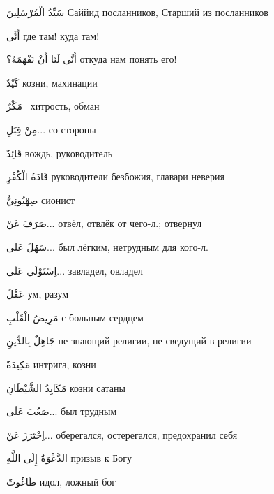 \documentclass[a5paper]{article}
\newcommand\textstyleDropCaps[1]{#1}
\newcommand\textstyleCaptioncharacters[1]{#1}
\begin{document}
\textstyleCaptioncharacters{سَيِّدُ الْمُرْسَلِينَ }\textstyleDropCaps{Сайй­ид посланников, Старший из посланников‎}

\textstyleCaptioncharacters{أَنَّى }\textstyleDropCaps{где там! куда там!‎}

\textstyleCaptioncharacters{أَنَّى لَنَا أَنْ نَفْهَمَهُ؟ }\textstyleDropCaps{откуда нам понять его! ‎}

\textstyleCaptioncharacters{كَيْدٌ }\textstyleDropCaps{козни, махинации‎}

\textstyleCaptioncharacters{مَكْرٌ \ }\textstyleDropCaps{хитрость, обман‎}

\textstyleCaptioncharacters{مِنْ قِبَلِ... }\textstyleDropCaps{со стороны‎}

\textstyleCaptioncharacters{قَائِدٌ }\textstyleDropCaps{вождь, руководитель‎}

\textstyleCaptioncharacters{قَادَةُ الْكُفْرِ }\textstyleDropCaps{руководите­ли безбожия, главари неверия‎}

\textstyleCaptioncharacters{صِهْيُونِيٌّ }\textstyleDropCaps{сионист‎}

\textstyleCaptioncharacters{صَرَفَ عَنْ... }\textstyleDropCaps{отвёл, от­влёк от чего-л.; отвернул‎}

\textstyleCaptioncharacters{سَهُلَ عَلى... }\textstyleDropCaps{был лёг­ким, нетрудным для кого-л.‎}

\textstyleCaptioncharacters{اِسْتَوْلَى عَلَى... }\textstyleDropCaps{завла­дел, овладел‎}

\textstyleCaptioncharacters{عَقْلٌ }\textstyleDropCaps{ум, разум‎}

\textstyleCaptioncharacters{مَرِيضُ الْقَلْبِ }\textstyleDropCaps{с боль­ным сердцем‎}

\textstyleCaptioncharacters{جَاهِلٌ بِالدِّينِ }\textstyleDropCaps{не знаю­щий религии, не сведущий в религии‎}

\textstyleCaptioncharacters{مَكِيدَةٌ }\textstyleDropCaps{интрига, козни‎}

\textstyleCaptioncharacters{مَكَايِدُ الشَّيْطَانِ }\textstyleDropCaps{козни сатаны‎}

\textstyleCaptioncharacters{صَعُبَ عَلَى... }\textstyleDropCaps{был труд­ным‎}

\textstyleCaptioncharacters{اِحْتَرَزَ عَنْ... }\textstyleDropCaps{оберегался, остерегался, предохранил себя‎}

\textstyleCaptioncharacters{الدَّعْوَةُ إِلَى اللَّهِ }\textstyleDropCaps{призыв к Богу‎}

\textstyleCaptioncharacters{طَاغُوتٌ }\textstyleDropCaps{идол, ложный бог‎}
\end{document}
